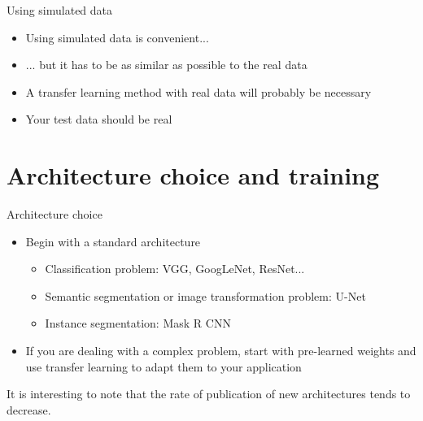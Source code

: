 \documentclass[xcolor=pdftex,dvipsnames,table,mathserif]{beamer}
\begin{document}
\begin{frame}{Using simulated data}

  \begin{itemize}[<+->]
  \item Using simulated data is convenient...
  \item ... but it has to be as similar as possible to the real data
  \item A transfer learning method with real data will probably be necessary
  \item Your test data should be real
  \end{itemize}

\end{frame}


\section{Architecture choice and training}

\begin{frame}{Architecture choice}

  \begin{itemize}[<+->]
  \item Begin with a standard architecture
    \begin{itemize}
    \item Classification problem: VGG, GoogLeNet, ResNet...
    \item Semantic segmentation or image transformation problem: U-Net
    \item Instance segmentation: Mask R CNN
    \end{itemize}
  \item If you are dealing with a complex problem, start with pre-learned weights and use transfer learning to adapt them to your application
  \end{itemize}

  \pause

  It is interesting to note that the rate of publication of new architectures tends to decrease.

\end{frame}


\end{document}
